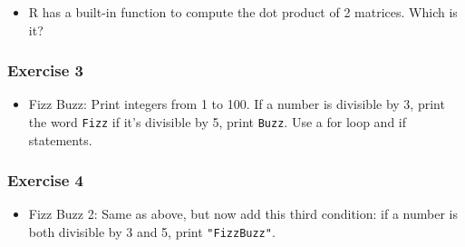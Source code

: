 \documentclass[]{gitbook}
\newenvironment{Shaded}{\begin{snugshade}}{\end{snugshade}}
\newcommand{\ControlFlowTok}[1]{\textcolor[rgb]{0.13,0.29,0.53}{\textbf{#1}}}
\newcommand{\DecValTok}[1]{\textcolor[rgb]{0.00,0.00,0.81}{#1}}
\newcommand{\KeywordTok}[1]{\textcolor[rgb]{0.13,0.29,0.53}{\textbf{#1}}}
\newcommand{\NormalTok}[1]{#1}
\newcommand{\OperatorTok}[1]{\textcolor[rgb]{0.81,0.36,0.00}{\textbf{#1}}}
\newcommand{\StringTok}[1]{\textcolor[rgb]{0.31,0.60,0.02}{#1}}
\providecommand{\tightlist}{%
  \setlength{\itemsep}{0pt}\setlength{\parskip}{0pt}}
\theoremstyle{definition}
\theoremstyle{definition}
\theoremstyle{definition}
\theoremstyle{remark}
\begin{document}
\begin{itemize}
\tightlist
\item
  R has a built-in function to compute the dot product of 2 matrices.
  Which is it?
\end{itemize}

\hypertarget{exercise-3-3}{%
\subsubsection*{Exercise 3}\label{exercise-3-3}}

\begin{itemize}
\tightlist
\item
  Fizz Buzz: Print integers from 1 to 100. If a number is divisible by
  3, print the word \texttt{Fizz} if it's divisible by 5, print
  \texttt{Buzz}. Use a for loop and if statements.
\end{itemize}

\hypertarget{exercise-4-1}{%
\subsubsection*{Exercise 4}\label{exercise-4-1}}

\begin{itemize}
\tightlist
\item
  Fizz Buzz 2: Same as above, but now add this third condition: if a
  number is both divisible by 3 and 5, print \texttt{"FizzBuzz"}.
\end{itemize}

\begin{Shaded}
\end{Shaded}
\end{document}
